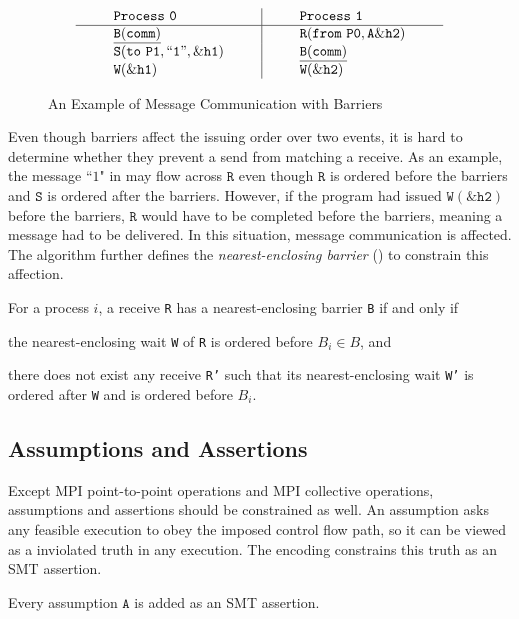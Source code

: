 \begin{figure}[h]
\[
\begin{array}{l|l}
\;\;\;\;\;\;\;\;\mathtt{Process\ 0}\;\;\;\;\;\;\;\; & \;\;\;\;\;\;\;\; \mathtt{Process\ 1}\;\;\;\;\;\;\;\; \\
\hline
\;\;\;\;\;\;\;\;\mathtt{\underline{B(comm)}}\;\;\;\;\;\;\;\; & \;\;\;\;\;\;\;\; \mathtt{R(from\ P0,A\&h2)}\;\;\;\;\;\;\;\; \\
\;\;\;\;\;\;\;\;\mathtt{S(to\ P1,``1",\&h1)}\;\;\;\;\;\;\;\; & \;\;\;\;\;\;\;\; \mathtt{\underline{B(comm)}}\;\;\;\;\;\;\;\; \\
\;\;\;\;\;\;\;\;\mathtt{W(\&h1)}\;\;\;\;\;\;\;\; & \;\;\;\;\;\;\;\; \mathtt{W(\&h2)}\;\;\;\;\;\;\;\; \\
\end{array}
\]
\caption{An Example of Message Communication with Barriers} \label{fig:mc_barrier1}
\end{figure}

Even though barriers affect the issuing order over two events, it is hard to determine whether they prevent a send from matching a receive. As an example, the message ``$1$" in  may flow across $\mathtt{R}$ even though $\mathtt{R}$ is ordered before the barriers and $\mathtt{S}$ is ordered after the barriers. However, if the program had issued $\mathtt{W(\&h2)}$ before the barriers, $\mathtt{R}$ would have to be completed before the barriers, meaning a message had to be delivered. In this situation, message communication is affected. The algorithm further defines the \textit{nearest-enclosing barrier} () to constrain this affection.

\begin{definition}\label{def:nb}
For a process $i$, a receive \texttt{R} has a nearest-enclosing barrier \texttt{B} if and only if
\begin{compactenum}
\item the nearest-enclosing wait \texttt{W} of \texttt{R} is ordered before $B_i\in B$, and
\item there does not exist any receive \texttt{R'} such that its nearest-enclosing wait \texttt{W'} is ordered after \texttt{W} and is ordered before $B_i$.
\end{compactenum}
\end{definition}


\subsection{Assumptions and Assertions}
Except MPI point-to-point operations and MPI collective operations, assumptions and assertions should be constrained as well. An assumption asks any feasible execution to obey the imposed control flow path, so it can be viewed as a inviolated truth in any execution. The encoding constrains this truth as an SMT assertion.
\begin{definition}[Assumption] \label{def:assm}
Every assumption $\mathtt{A}$ is added as an SMT assertion.
\end{definition}

